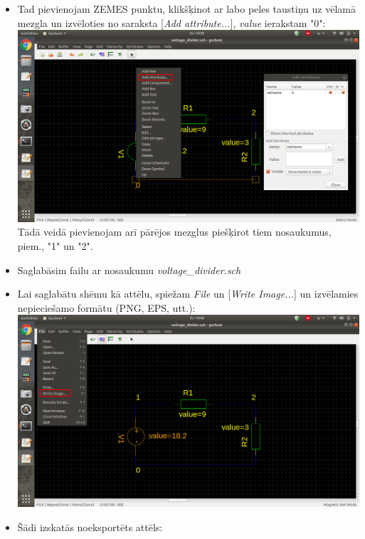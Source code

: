 \documentclass[12pt,a4paper]{report}
\begin{document}
\begin{itemize}
  \item Tad pievienojam ZEMES punktu, klikšķinot ar labo peles taustiņu uz vēlamā mezgla un izvēloties no saraksta [\emph{Add attribute...}], \emph{value} ierakstam "0":\\
        \includegraphics[scale=0.3]{3}\\
        Tādā veidā pievienojam arī pārējos mezglus piešķirot tiem nosaukumus, piem., "1" un "2".\\
  \item Saglabāsim failu ar nosaukumu \emph{voltage\_divider.sch}\\
        \pagebreak
  \item Lai saglabātu shēmu kā attēlu, spiežam \emph{File} un [\emph{Write Image...}] un izvēlamies nepieciešamo formātu (PNG, EPS, utt.):\\
         \includegraphics[scale=0.3]{4}\\
  \item Šādi izskatās noeksportēts attēls:\\

\end{itemize}
\end{document}
